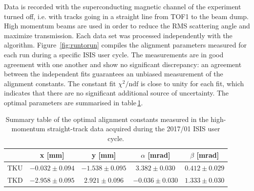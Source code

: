 Data is recorded with the superconducting magnetic channel of the experiment turned off, i.e. with tracks going in a straight line from TOF1 to the beam dump. High momentum beams are used in order to reduce the RMS scattering angle and maximize transmission.  
Each data set was processed independently with the algorithm. Figure~\ref{fig:runtorun} compiles the alignment parameters measured for each run during a specific ISIS user cycle. The measurements are in good agreement with one another and show no significant discrepancy: an agreement between the independent fits guarantees an unbiased measurement of the alignment constants. The constant fit $\chi^2/\text{ndf}$ is close to unity for each fit, which indicates that there are no significant additional source of uncertainty. The optimal parameters are summarised in table\,\ref{tab:201701_constants}. 

\begin{table}[ht!]
	\centering
		\begin{tabular}{l|c|c|c|c}
			& x [mm] & y [mm] & $\alpha$ [mrad] & $\beta$ [mrad] \\
			\hline
			TKU & $-0.032\pm0.094$ & $-1.538\pm0.095$ & $ 3.382\pm0.030$ & $0.412\pm0.029$ \\
			TKD & $-2.958\pm0.095$ & $ 2.921\pm0.096$ & $-0.036\pm0.030$ & $1.333\pm0.030$
		\end{tabular}
	\caption{Summary table of the optimal alignment constants measured in the high-momentum straight-track data acquired during the 2017/01 ISIS user cycle.}
	\label{tab:201701_constants}
\end{table}

